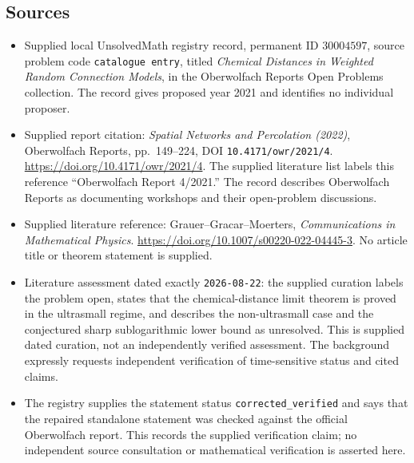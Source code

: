 \documentclass[11pt]{article}
\begin{document}
\subsection{Sources}
\begin{itemize}
\item Supplied local UnsolvedMath registry record, permanent ID \(30004597\), source problem code \texttt{catalogue entry}, titled \emph{Chemical Distances in Weighted Random Connection Models}, in the Oberwolfach Reports Open Problems collection. The record gives proposed year 2021 and identifies no individual proposer.
\item Supplied report citation: \emph{Spatial Networks and Percolation (2022)}, Oberwolfach Reports, pp.\ 149--224, DOI \texttt{10.4171/owr/2021/4}. \url{https://doi.org/10.4171/owr/2021/4}. The supplied literature list labels this reference ``Oberwolfach Report 4/2021.'' The record describes Oberwolfach Reports as documenting workshops and their open-problem discussions.
\item Supplied literature reference: Grauer--Gracar--Moerters, \emph{Communications in Mathematical Physics}. \url{https://doi.org/10.1007/s00220-022-04445-3}. No article title or theorem statement is supplied.
\item Literature assessment dated exactly \texttt{2026-08-22}: the supplied curation labels the problem open, states that the chemical-distance limit theorem is proved in the ultrasmall regime, and describes the non-ultrasmall case and the conjectured sharp sublogarithmic lower bound as unresolved. This is supplied dated curation, not an independently verified assessment. The background expressly requests independent verification of time-sensitive status and cited claims.
\item The registry supplies the statement status \texttt{corrected\_verified} and says that the repaired standalone statement was checked against the official Oberwolfach report. This records the supplied verification claim; no independent source consultation or mathematical verification is asserted here.
\end{itemize}
\end{document}
